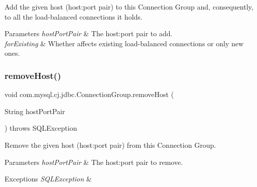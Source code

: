 Add the given host (host\+:port pair) to this Connection Group and, consequently, to all the load-\/balanced connections it holds.


\begin{DoxyParams}{Parameters}
{\em host\+Port\+Pair} & The host\+:port pair to add. \\
\hline
{\em for\+Existing} & Whether affects existing load-\/balanced connections or only new ones. \\
\hline
\end{DoxyParams}
\mbox{\label{classcom_1_1mysql_1_1cj_1_1jdbc_1_1_connection_group_a688ad628516ef76db003381b4180c175}} 
\subsubsection{\texorpdfstring{remove\+Host()}{removeHost()}\hspace{0.1cm}{\footnotesize\ttfamily [1/3]}}
{\footnotesize\ttfamily void com.\+mysql.\+cj.\+jdbc.\+Connection\+Group.\+remove\+Host (\begin{DoxyParamCaption}\item[{String}]{host\+Port\+Pair }\end{DoxyParamCaption}) throws S\+Q\+L\+Exception}

Remove the given host (host\+:port pair) from this Connection Group.


\begin{DoxyParams}{Parameters}
{\em host\+Port\+Pair} & The host\+:port pair to remove. \\
\hline
\end{DoxyParams}

\begin{DoxyExceptions}{Exceptions}
{\em S\+Q\+L\+Exception} & \\
\hline
\end{DoxyExceptions}
\mbox{\label{classcom_1_1mysql_1_1cj_1_1jdbc_1_1_connection_group_a129dcc7b87611dee38ad5f28ec59d1af}} 
